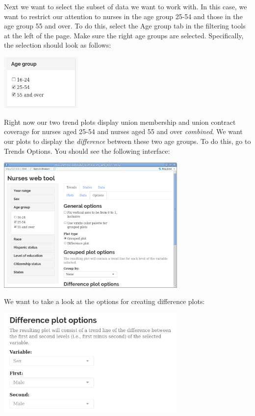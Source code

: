 \documentclass[letterpaper,12pt]{article}
\begin{document}
\begin{enumerate}
  Next we want to select the subset of data we want to work with. In
  this case, we want to restrict our attention to nurses in the age
  group 25-54 and those in the age group 55 and over. To do this,
  select the Age group tab in the filtering tools at the left of the
  page. Make sure the right age groups are selected. Specifically, the
  selection should look as follows:
  \begin{center}
    \includegraphics[width=0.3\textwidth]{images/trends_ex2/age_selection.png}
  \end{center}
  Right now our two trend plots display union membership and union
  contract coverage for nurses aged 25-54 and nurses aged 55 and over
  \emph{combined}. We want our plots to display the \emph{difference}
  between these two age groups. To do this, go to Trends
  \textrightarrow{} Options. You should see the following interface:
  \begin{center}
    \includegraphics[width=0.7\textwidth]{images/trends_ex2/options_interface.png}
  \end{center}
  We want to take a look at the options for creating difference plots:
  \begin{center}
    \includegraphics[width=0.7\textwidth]{images/trends_ex2/options_diff_plots.png}

\end{center}
\end{enumerate}
\end{document}
